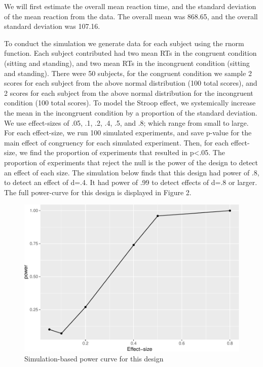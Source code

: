 \documentclass[
  english,
  man]{apa6}
\begin{document}
We will first estimate the overall mean reaction time, and the standard deviation of the mean reaction from the data. The overall mean was 868.65, and the overall standard deviation was 107.16.

To conduct the simulation we generate data for each subject using the rnorm function. Each subject contributed had two mean RTs in the congruent condition (sitting and standing), and two mean RTs in the incongruent condition (sitting and standing). There were 50 subjects, for the congruent condition we sample 2 scores for each subject from the above normal distribution (100 total scores), and 2 scores for each subject from the above normal distribution for the incongruent condition (100 total scores). To model the Stroop effect, we systemically increase the mean in the incongruent condition by a proportion of the standard deviation. We use effect-sizes of .05, .1, .2, .4, .5, and .8; which range from small to large. For each effect-size, we run 100 simulated experiments, and save p-value for the main effect of congruency for each simulated experiment. Then, for each effect-size, we find the proportion of experiments that resulted in p\textless.05. The proportion of experiments that reject the null is the power of the design to detect an effect of each size. The simulation below finds that this design had power of .8, to detect an effect of d=.4. It had power of .99 to detect effects of d=.8 or larger. The full power-curve for this design is displayed in Figure 2.

\begin{figure}
\centering
\includegraphics{APAreport_files/figure-latex/powerfig-1.pdf}
\caption{\label{fig:powerfig}Simulation-based power curve for this design}
\end{figure}
\end{document}
